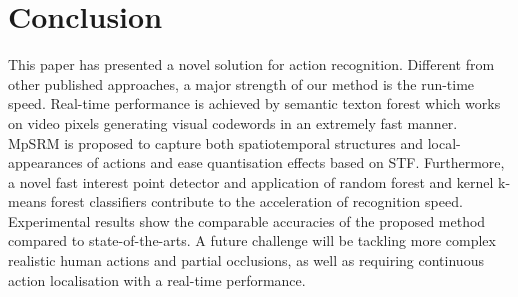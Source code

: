 \section{Conclusion}
\label{sec:discussion}
This paper has presented a novel solution for action recognition. Different from other published approaches, a major strength of our method is the run-time speed. Real-time performance is achieved by semantic texton forest which works on video pixels generating visual codewords in an extremely fast manner. MpSRM is proposed to capture both spatiotemporal structures and local-appearances of actions and ease quantisation effects based on STF. Furthermore, a novel fast interest point detector and application of random forest and kernel k-means forest classifiers contribute to the acceleration of recognition speed. Experimental results show the comparable accuracies of the proposed method compared to state-of-the-arts. A future challenge will be tackling more complex realistic human actions and partial occlusions, as well as requiring continuous action localisation with a real-time performance.

